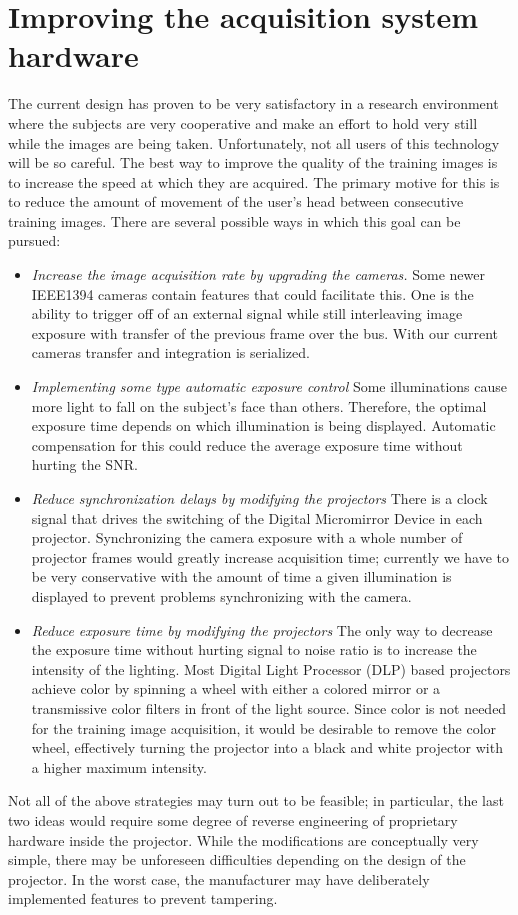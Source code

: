 \section{Improving the acquisition system hardware}
The current design has proven to be very satisfactory in a research environment where the subjects are very cooperative and make an effort to hold very still while the images are being taken.  Unfortunately, not all users of this technology will be so careful.  The best way to improve the quality of the training images is to increase the speed at which they are acquired.  The primary motive for this is to reduce the amount of movement of the user's head between consecutive training images.  There are several possible ways in which this goal can be pursued:
\begin{itemize}
\item {\em Increase the image acquisition rate by upgrading the cameras.}  Some newer IEEE1394 cameras contain features that could facilitate this.  One is the ability to trigger off of an external signal while still interleaving image exposure with transfer of the previous frame over the bus.  With our current cameras transfer and integration is serialized.  
\item {\em Implementing some type automatic exposure control}  Some illuminations cause more light to fall on the subject's face than others.  Therefore, the optimal exposure time depends on which illumination is being displayed.  Automatic compensation for this could reduce the average exposure time without hurting the SNR.
\item {\em Reduce synchronization delays by modifying the projectors}  There is a clock signal that drives the switching of the Digital Micromirror Device in each projector.  Synchronizing the camera exposure with a whole number of projector frames would greatly increase acquisition time; currently we have to be very conservative with the amount of time a given illumination is displayed to prevent problems synchronizing with the camera.
\item {\em Reduce exposure time by modifying the projectors}  The only way to decrease the exposure time without hurting signal to noise ratio is to increase the intensity of the lighting.  Most Digital Light Processor (DLP) based projectors achieve color by spinning a wheel with either a colored mirror or a transmissive color filters in front of the light source.  Since color is not needed for  the training image acquisition, it would be desirable to remove the color wheel, effectively turning the projector into a black and white projector with a higher maximum intensity.
\end{itemize}
Not all of the above strategies may turn out to be feasible; in particular, the last two ideas would require some degree of reverse engineering of proprietary hardware inside the projector.  While the modifications are conceptually very simple, there may be unforeseen difficulties depending on the design of the projector.  In the worst case, the manufacturer may have deliberately implemented features to prevent tampering.

